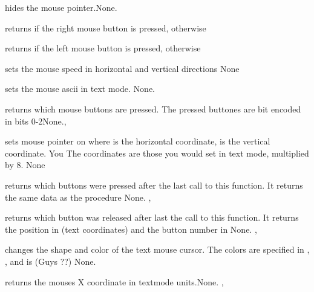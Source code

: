{ hides the mouse pointer.}{None.}{}


{  returns  if the right mouse button is pressed,
 otherwise}{}

{  returns  if the left mouse button is pressed,
 otherwise}{}

{ sets the mouse speed in horizontal and vertical
directions}
{None}
{}

{ sets the mouse ascii in text
mode.}
{None.}
{}

{  returns which mouse buttons are pressed. The pressed
buttones are bit encoded in bits 0-2}{None.}{, }

{ sets mouse pointer on  where  is the
horizontal coordinate,  is the vertical coordinate. You The
coordinates are those you would set in text mode, multiplied by 8.}
{None}{}

{ returns which buttons were pressed after the last call to
this function. It returns the same data as the 
procedure}
{None.}
{, }

{ returns which button was released after last the call to
this function. It returns the position in  (text coordinates) and
the button number in  }
{None.}
{, }

{ changes the shape and color of the text mouse cursor.
The colors are specified in , , and
 is (Guys ??)}
{None.}
{}

{ returns the mouses X coordinate in textmode units.}{None.}
{, }

